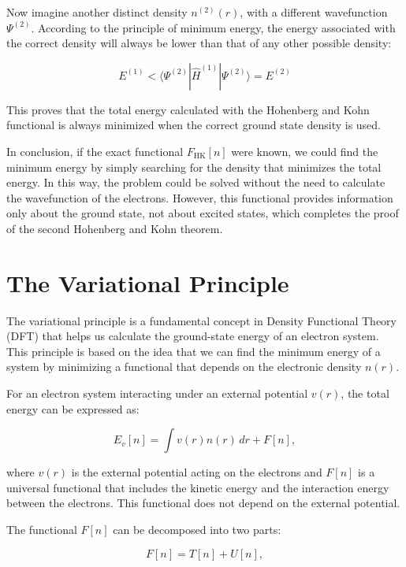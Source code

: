 \documentclass[%
 preprint, linenumbers,
 amsmath,amssymb,
 aps, physrev,
]{revtex4-2}
\begin{document}
Now imagine another distinct density \( n^{(2)}(r) \), with a different wavefunction \( \Psi^{(2)} \). According to the principle of minimum energy, the energy associated with the correct density will always be lower than that of any other possible density:

\begin{equation}
E^{(1)} < \langle \Psi^{(2)} | \hat{H}^{(1)} | \Psi^{(2)} \rangle = E^{(2)}
\end{equation}

This proves that the total energy calculated with the Hohenberg and Kohn functional is always minimized when the correct ground state density is used.

In conclusion, if the exact functional \( F_{\text{HK}}[n] \) were known, we could find the minimum energy by simply searching for the density that minimizes the total energy. In this way, the problem could be solved without the need to calculate the wavefunction of the electrons. However, this functional provides information only about the ground state, not about excited states, which completes the proof of the second Hohenberg and Kohn theorem.

\section{\label{sec:level1}The Variational Principle }

The variational principle is a fundamental concept in Density Functional Theory (DFT) that helps us calculate the ground-state energy of an electron system. This principle is based on the idea that we can find the minimum energy of a system by minimizing a functional that depends on the electronic density \( n(r) \).

For an electron system interacting under an external potential \( v(r) \), the total energy can be expressed as:

\begin{equation}
E_v[n] = \int v(r) n(r) \, dr + F[n],
\end{equation}

where \( v(r) \) is the external potential acting on the electrons and \( F[n] \) is a universal functional that includes the kinetic energy and the interaction energy between the electrons. This functional does not depend on the external potential.

The functional \( F[n] \) can be decomposed into two parts:

\begin{equation}
F[n] = T[n] + U[n],
\end{equation}
\end{document}
